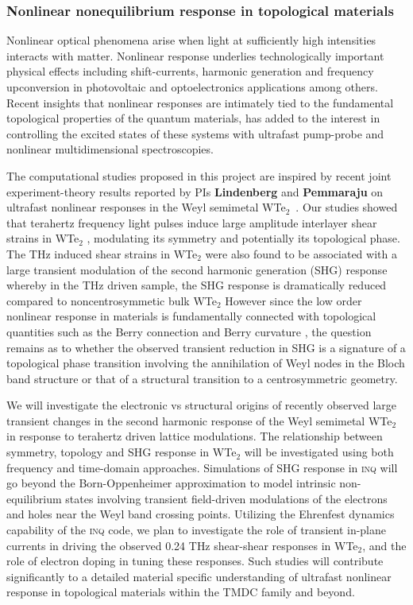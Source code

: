 \subsubsection{Nonlinear nonequilibrium response in topological materials}

Nonlinear optical phenomena arise when light at sufficiently high intensities interacts with matter. Nonlinear response underlies technologically important physical effects including shift-currents, harmonic generation and frequency upconversion in photovoltaic and optoelectronics applications among others.  Recent insights that nonlinear responses are intimately tied to the fundamental topological properties of the quantum materials, has added to the interest in controlling the excited states of these systems with  ultrafast pump-probe and nonlinear multidimensional spectroscopies.

The computational studies proposed in this project are inspired by recent joint experiment-theory results reported by PIs {\bf Lindenberg} and {\bf Pemmaraju} on ultrafast nonlinear responses in the Weyl semimetal WTe$_2$~\cite{Xiao_2020}. Our studies showed that terahertz frequency light pulses induce large amplitude interlayer shear strains in WTe$_2$ , modulating its symmetry and potentially its topological phase. The THz induced shear strains in WTe$_2$ were also found to be associated with a large transient modulation of the second harmonic generation (SHG) response whereby in the THz driven sample, the SHG response is dramatically reduced compared to noncentrosymmetic bulk WTe$_2$ However since the low order nonlinear response in materials is fundamentally connected with topological quantities such as the Berry connection and Berry curvature , the question remains as to whether the observed transient reduction in SHG is a signature of a topological phase transition involving the annihilation of Weyl nodes in the Bloch band structure or that of a structural transition to a centrosymmetric geometry.

We will investigate the electronic vs structural origins of recently observed large transient changes in the second harmonic response of the Weyl semimetal WTe$_2$ in response to terahertz driven lattice modulations. The relationship between symmetry, topology and SHG response in WTe$_2$ will be investigated using both frequency and time-domain approaches. Simulations of SHG response in \textsc{inq} will go beyond the Born-Oppenheimer approximation to model intrinsic non-equilibrium states involving transient field-driven modulations of the electrons and holes near the Weyl band crossing points. Utilizing the Ehrenfest dynamics capability of the \textsc{inq} code, we plan to investigate the role of transient in-plane currents in driving the observed 0.24 THz shear-shear responses in WTe$_2$, and the role of electron doping in tuning these responses. Such studies will contribute significantly to a detailed material specific understanding of ultrafast nonlinear response in topological materials within the TMDC family and beyond.

\clearpage
